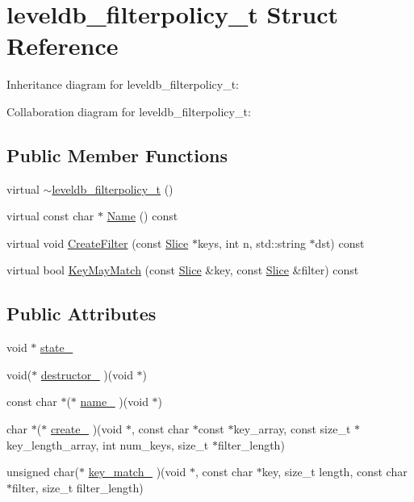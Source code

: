 \hypertarget{structleveldb__filterpolicy__t}{}\section{leveldb\+\_\+filterpolicy\+\_\+t Struct Reference}
\label{structleveldb__filterpolicy__t}


Inheritance diagram for leveldb\+\_\+filterpolicy\+\_\+t\+:


Collaboration diagram for leveldb\+\_\+filterpolicy\+\_\+t\+:
\subsection*{Public Member Functions}
\begin{DoxyCompactItemize}
\item 
virtual \hyperlink{structleveldb__filterpolicy__t_afea40a87cf4123be464f22d021dec9f3}{$\sim$leveldb\+\_\+filterpolicy\+\_\+t} ()
\item 
virtual const char $\ast$ \hyperlink{structleveldb__filterpolicy__t_a2d2e4bed02de91075ce921005c851a3e}{Name} () const 
\item 
virtual void \hyperlink{structleveldb__filterpolicy__t_a8b5b77b6a8d1c526905c7eb57d78558b}{Create\+Filter} (const \hyperlink{classleveldb_1_1_slice}{Slice} $\ast$keys, int n, std\+::string $\ast$dst) const 
\item 
virtual bool \hyperlink{structleveldb__filterpolicy__t_aa3006a26cac563bb5115d27d83b6865f}{Key\+May\+Match} (const \hyperlink{classleveldb_1_1_slice}{Slice} \&key, const \hyperlink{classleveldb_1_1_slice}{Slice} \&filter) const 
\end{DoxyCompactItemize}
\subsection*{Public Attributes}
\begin{DoxyCompactItemize}
\item 
void $\ast$ \hyperlink{structleveldb__filterpolicy__t_a35aa5dd2f350f6eafa4ae904e55dcbe2}{state\+\_\+}
\item 
void($\ast$ \hyperlink{structleveldb__filterpolicy__t_ac743c53a14a4061cf30832a1861573ed}{destructor\+\_\+} )(void $\ast$)
\item 
const char $\ast$($\ast$ \hyperlink{structleveldb__filterpolicy__t_a5fbc18ad0916314ffafe205543bad720}{name\+\_\+} )(void $\ast$)
\item 
char $\ast$($\ast$ \hyperlink{structleveldb__filterpolicy__t_a170514ed800318edc4d296e061d5e813}{create\+\_\+} )(void $\ast$, const char $\ast$const $\ast$key\+\_\+array, const size\+\_\+t $\ast$key\+\_\+length\+\_\+array, int num\+\_\+keys, size\+\_\+t $\ast$filter\+\_\+length)
\item 
unsigned char($\ast$ \hyperlink{structleveldb__filterpolicy__t_a453f04cb3420879256c6194b5de0a818}{key\+\_\+match\+\_\+} )(void $\ast$, const char $\ast$key, size\+\_\+t length, const char $\ast$filter, size\+\_\+t filter\+\_\+length)
\end{DoxyCompactItemize}


